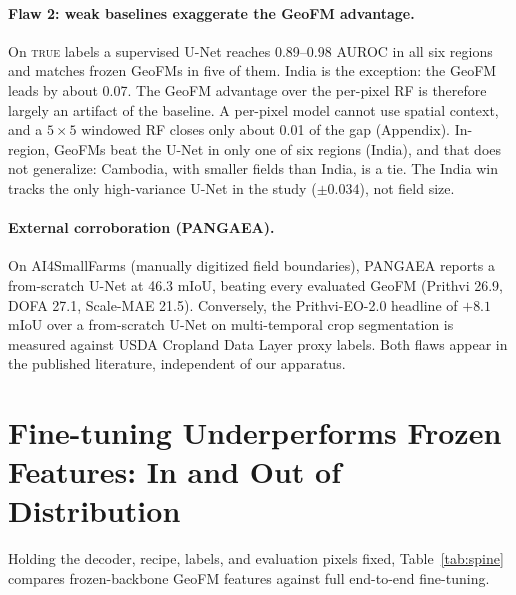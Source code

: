 \documentclass{article}
\begin{document}
\paragraph{Flaw 2: weak baselines exaggerate the GeoFM advantage.} On \textsc{true}
labels a supervised U-Net reaches 0.89--0.98 AUROC in all six regions and matches
frozen GeoFMs in five of them. India is the exception: the GeoFM leads by about
0.07. The GeoFM advantage over the per-pixel RF is therefore largely an artifact of
the baseline. A per-pixel model cannot use spatial context, and a $5\times5$ windowed
RF closes only about 0.01 of the gap (Appendix). In-region, GeoFMs beat the U-Net in
only one of six regions (India), and that does not generalize: Cambodia, with
smaller fields than India, is a tie. The India win tracks the only high-variance
U-Net in the study ($\pm0.034$), not field size.

\paragraph{External corroboration (PANGAEA).} On AI4SmallFarms \citep{ai4smallfarms}
(manually digitized field boundaries), PANGAEA \citep{pangaea} reports a from-scratch
U-Net at 46.3 mIoU, beating every evaluated GeoFM (Prithvi 26.9, DOFA 27.1, Scale-MAE
21.5). Conversely, the Prithvi-EO-2.0 headline of $+8.1$ mIoU over a from-scratch
U-Net on multi-temporal crop segmentation \citep{prithvi} is measured against USDA
Cropland Data Layer proxy labels. Both flaws appear in the published literature,
independent of our apparatus.

\section{Fine-tuning Underperforms Frozen Features: In and Out of Distribution}
\label{sec:spine}
Holding the decoder, recipe, labels, and evaluation pixels fixed, Table~\ref{tab:spine}
compares frozen-backbone GeoFM features against full end-to-end fine-tuning.
\end{document}
